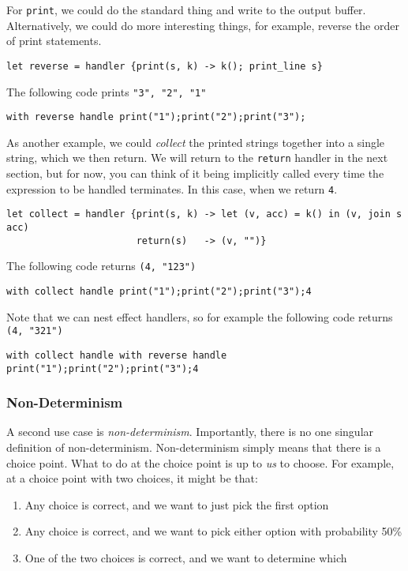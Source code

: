 For \texttt{print}, we could do the standard thing and write to the output buffer. Alternatively, we could do more interesting things, for example, reverse the order of print statements.
\begin{verbatim}
let reverse = handler {print(s, k) -> k(); print_line s}
\end{verbatim}
The following code prints \texttt{"3", "2", "1"}
\begin{verbatim}
with reverse handle print("1");print("2");print("3");
\end{verbatim}
As another example, we could \textit{collect} the printed strings together into a single string, which we then return. We will return to the \texttt{return} handler in the next section, but for now, you can think of it being implicitly called every time the expression to be handled terminates. In this case, when we return \texttt{4}.
\begin{verbatim}
let collect = handler {print(s, k) -> let (v, acc) = k() in (v, join s acc)
                       return(s)   -> (v, "")}
\end{verbatim}
The following code returns \texttt{(4, "123")}
\begin{verbatim}
with collect handle print("1");print("2");print("3");4
\end{verbatim}
Note that we can nest effect handlers, so for example the following code returns \texttt{(4, "321")}
\begin{verbatim}
with collect handle with reverse handle print("1");print("2");print("3");4
\end{verbatim}
\subsubsection{Non-Determinism}
A second use case is \textit{non-determinism}. Importantly, there is no one singular definition of non-determinism. Non-determinism simply means that there is a choice point. What to do at the choice point is up to \textit{us} to choose. For example, at a choice point with two choices, it might be that:

\begin{enumerate}
    \item Any choice is correct, and we want to just pick the first option
    \item Any choice is correct, and we want to pick either option with probability 50\% 
    \item One of the two choices is correct, and we want to determine which
\end{enumerate}


